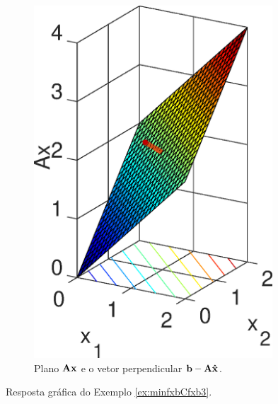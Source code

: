 \begin{SolutionT}
\begin{figure}[h!]
\begin{subfigure}[b]{0.32\textwidth}
         \includegraphics[width=0.98\textwidth]{chapters/minimization-fx/mfiles/ax1/surfcax.eps}
         \caption{Plano $\MATRIX{A}\VECTOR{x}$ e o vetor perpendicular $\VECTOR{b}-\MATRIX{A}\VECTOR{\hat{X}}$.}
         \label{fig:ex:minAxbCAxb:b}
     \end{subfigure}
        \caption{Resposta gráfica do Exemplo \ref{ex:minfxbCfxb3}. }
        \label{fig:ex:minAxbCAxb}
\end{figure}

\end{SolutionT}
